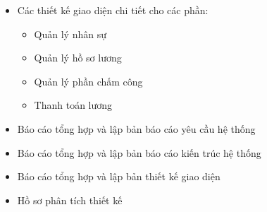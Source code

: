 {\begin{minipage}{\textwidth}
\begin{itemize}
\begin{itemize}
            \item Nhân sự
            \item Hồ sơ lương
            \item Phần chấm công
            \item Thanh toán lương
        \end{itemize}
        \item Các thiết kế giao diện chi tiết cho các phần:
        \begin{itemize}
            \item Quản lý nhân sự
            \item Quản lý hồ sơ lương
            \item Quản lý phần chấm công
            \item Thanh toán lương
        \end{itemize}
        \item Báo cáo tổng hợp và lập bản báo cáo yêu cầu hệ thống
        \item Báo cáo tổng hợp và lập bản báo cáo kiến trúc hệ thống
        \item Báo cáo tổng hợp và lập bản thiết kế giao diện
        \item Hồ sơ phân tích thiết kế
    \end{itemize}
    \end{minipage}
}
\newpage
